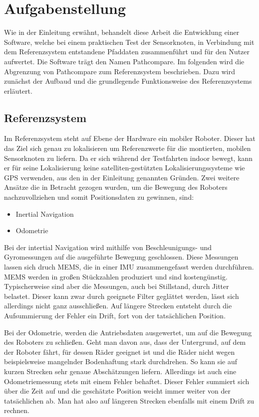 \section{Aufgabenstellung}
\label{sec:aufgabenstellung}

Wie in der Einleitung erwähnt, behandelt diese Arbeit die Entwicklung einer
Software, welche bei einem praktischen Test der Sensorknoten, in Verbindung mit
dem Referenzsystem entstandene Pfaddaten zusammenführt und für den Nutzer
aufwertet. Die Software trägt den Namen Pathcompare.
Im folgenden wird die Abgrenzung von Pathcompare zum 
Referenzsystem beschrieben. Dazu wird zunächst der Aufbaud und die grundlegende
Funktionsweise des Referenzsystems erläutert.

\subsection{Referenzsystem}
\label{sub:roboter}

Im Referenzsystem steht auf Ebene der Hardware ein mobiler Roboter. Dieser hat
das Ziel sich genau zu lokalisieren um Referenzwerte für die montierten,
mobilen Sensorknoten zu liefern. Da er sich während der Testfahrten indoor
bewegt, kann er für seine Lokalisierung keine satelliten-gestützten
Lokalisierungssysteme wie GPS verwenden, aus den in der Einleitung genannten
Gründen. Zwei weitere Ansätze die in Betracht gezogen wurden, um die Bewegung
des Roboters nachzuvollziehen und somit Positionsdaten zu gewinnen, sind:

\begin{itemize}
  \item Inertial Navigation
  \item Odometrie
\end{itemize}

Bei der intertial Navigation wird mithilfe von Beschleunigungs- und
Gyromessungen auf die ausgeführte Bewegung geschlossen. Diese Messungen lassen
sich druch \gls{MEMS}, die in einer 
\gls{IMU} zusammengefasst werden durchführen.
\gls{MEMS} werden in großen Stückzahlen produziert und sind kostengünstig.
Typischerweise sind aber die Messungen, auch bei Stillstand, durch Jitter belastet.
Dieser kann zwar durch geeignete Filter geglättet werden, lässt sich allerdings
nicht ganz ausschließen. Auf längere Strecken entsteht durch die Aufsummierung
der Fehler ein Drift, fort von der tatsächlichen Position.

Bei der Odometrie, werden die Antriebsdaten ausgewertet, um auf die Bewegung
des Roboters zu schließen. Geht man davon aus, dass der Untergrund, auf dem der
Roboter fährt, für dessen Räder geeignet ist und die Räder nicht wegen
beispielsweise mangelnder Bodenhaftung stark durchdrehen. So kann sie auf
kurzen Strecken sehr genaue Abschätzungen liefern. Allerdings ist auch eine
Odometriemessung stets mit einem Fehler behaftet. Dieser Fehler summiert sich
über die Zeit auf und die geschätzte Position weicht immer weiter von der
tatsächlichen ab. Man hat also auf längeren Strecken ebenfalls mit einem Drift
zu rechnen.

